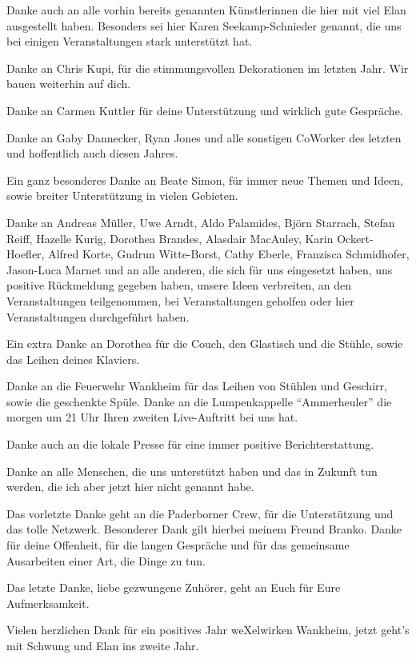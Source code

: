 \begin{appendix}
Danke auch an alle vorhin bereits genannten Künstlerinnen die hier mit viel Elan ausgestellt haben.
Besonders sei hier Karen Seekamp-Schnieder genannt, die uns bei einigen Veranstaltungen stark unterstützt hat.

Danke an Chris Kupi, für die stimmungsvollen Dekorationen im letzten Jahr. Wir bauen weiterhin auf dich.

Danke an Carmen Kuttler für deine Unterstützung und wirklich gute Gespräche.

Danke an Gaby Dannecker, Ryan Jones und alle sonstigen CoWorker des letzten und hoffentlich auch diesen Jahres.

Ein ganz besonderes Danke an Beate Simon, für immer neue Themen und Ideen, sowie breiter Unterstützung in vielen Gebieten.

Danke an Andreas Müller, Uwe Arndt, Aldo Palamides, Björn Starrach, Stefan Reiff, Hazelle Kurig, Dorothea Brandes, Alasdair MacAuley, Karin Ockert-Hoefler, Alfred Korte, Gudrun Witte-Borst, Cathy Eberle, Franzisca Schmidhofer, Jason-Luca Marnet und an alle anderen, die sich für uns eingesetzt haben, uns positive Rückmeldung gegeben haben, unsere Ideen verbreiten, an den Veranstaltungen teilgenommen, bei Veranstaltungen geholfen oder hier Veranstaltungen durchgeführt haben.  

Ein extra Danke an Dorothea für die Couch, den Glastisch und die Stühle, sowie das Leihen deines Klaviers.

Danke an die Feuerwehr Wankheim für das Leihen von Stühlen und Geschirr, sowie die geschenkte Spüle. Danke an die Lumpenkappelle "`Ammerheuler"' die morgen um 21 Uhr Ihren zweiten Live-Auftritt bei uns hat.

Danke auch an die lokale Presse für eine immer positive Berichterstattung.


Danke an alle Menschen, die uns unterstützt haben und das in Zukunft tun werden, die ich aber jetzt hier nicht genannt habe.

Das vorletzte Danke geht an die Paderborner Crew, für die Unterstützung und das tolle Netzwerk.  Besonderer Dank gilt hierbei meinem Freund Branko. Danke für deine Offenheit, für die langen Gespräche und für das gemeinsame Ausarbeiten einer Art, die Dinge zu tun.

Das letzte Danke, liebe gezwungene Zuhörer, geht an Euch für Eure Aufmerksamkeit.

Vielen herzlichen Dank für ein positives Jahr weXelwirken Wankheim, jetzt geht’s mit Schwung und Elan ins zweite Jahr.




\end{appendix}